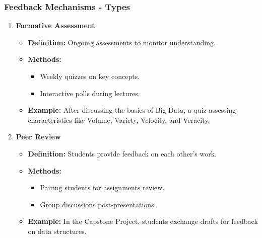 \documentclass[aspectratio=169]{beamer}
\begin{document}
\begin{frame}[fragile]
    \frametitle{Feedback Mechanisms - Types}
    \begin{enumerate}
        \item \textbf{Formative Assessment}
        \begin{itemize}
            \item \textbf{Definition:} Ongoing assessments to monitor understanding.
            \item \textbf{Methods:}
            \begin{itemize}
                \item Weekly quizzes on key concepts.
                \item Interactive polls during lectures.
            \end{itemize}
            \item \textbf{Example:} After discussing the basics of Big Data, a quiz assessing characteristics like Volume, Variety, Velocity, and Veracity.
        \end{itemize}
        
        \item \textbf{Peer Review}
        \begin{itemize}
            \item \textbf{Definition:} Students provide feedback on each other’s work.
            \item \textbf{Methods:}
            \begin{itemize}
                \item Pairing students for assignments review.
                \item Group discussions post-presentations.
            \end{itemize}
            \item \textbf{Example:} In the Capstone Project, students exchange drafts for feedback on data structures.
        \end{itemize}
    \end{enumerate}
\end{frame}
\end{document}

